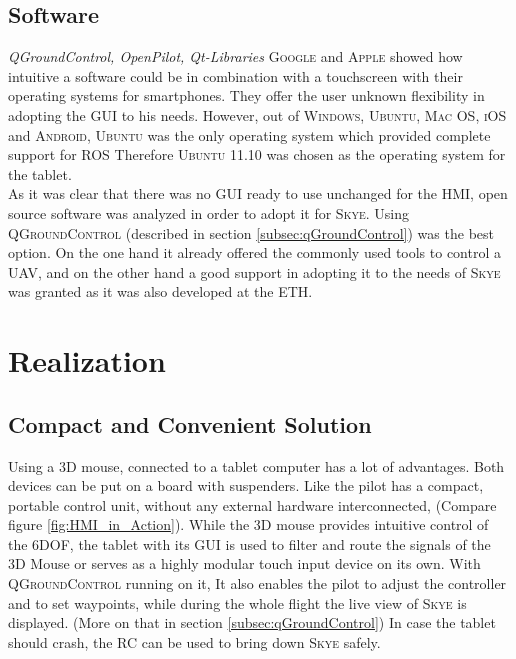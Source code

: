 \subsection{Software}
\textit{QGroundControl, OpenPilot, Qt-Libraries}
\textsc{Google} and \textsc{Apple} showed how intuitive a software could be in combination with a  touchscreen with their operating systems for smartphones. They offer the user unknown flexibility in adopting the GUI to his needs. However, out of \textsc{Windows}, \textsc{Ubuntu}, \textsc{Mac OS}, \textsc{iOS} and \textsc{Android}, \textsc{Ubuntu} was the only operating system which provided complete support for \textsc{ROS}  Therefore \textsc{Ubuntu 11.10} was chosen as the operating system for the tablet.\\
As it was clear that there was no GUI ready to use unchanged for the HMI, open source software was analyzed in order to adopt it for \textsc{Skye}. Using \textsc{QGroundControl} (described in section \ref{subsec:qGroundControl}) was the best option. On the one hand it already offered the commonly used tools to control a UAV, and on the other hand a good support in adopting it to the needs of \textsc{Skye} was granted as it was also developed at the \textsc{ETH}.




\section{Realization}
\label{sec:realization}



\subsection{Compact and Convenient Solution}
Using a 3D mouse, connected to a tablet computer has a lot of advantages. Both devices can be put on a board with suspenders. Like the pilot has a compact, portable control unit, without any external hardware interconnected, (Compare figure \ref{fig:HMI_in_Action}). While the 3D mouse provides intuitive control of the 6DOF, the tablet with its GUI is used to filter and route the signals of the 3D Mouse or serves as a highly modular touch input device on its own. With \textsc{QGroundControl} running on it, It also enables the pilot to adjust the controller and to set waypoints, while during the whole flight the live view of \textsc{Skye} is displayed. (More on that in section \ref{subsec:qGroundControl}) In case the tablet should crash, the RC can be used to bring down \textsc{Skye} safely.

